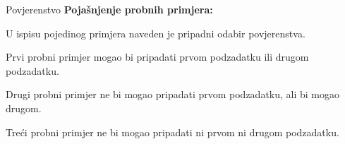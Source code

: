 \begin{statement}[
  problempoints=100,
  timelimit=3 sekunde,
  memorylimit=512 MiB,
]{Povjerenstvo}
\textbf{Pojašnjenje probnih primjera:}

U ispisu pojedinog primjera naveden je pripadni odabir povjerenstva.

Prvi probni primjer mogao bi pripadati prvom podzadatku ili drugom podzadatku.

Drugi probni primjer ne bi mogao pripadati prvom podzadatku, ali bi mogao drugom.

Treći probni primjer ne bi mogao pripadati ni prvom ni drugom podzadatku.

\end{statement}

